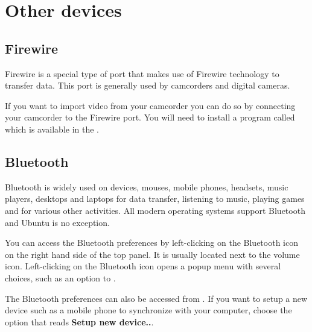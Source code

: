



\section{Other devices}
\label{sec:other-devices}
 
\subsection{Firewire}

Firewire is a special type of port that makes use of Firewire technology to 
transfer data. This port is generally used by camcorders and digital cameras. 

If you want to import video from your camcorder you can do so by connecting your camcorder to the Firewire port. 
You will need to install a program called  which is available in the . 

\subsection{Bluetooth}

Bluetooth is widely used on  devices, mouses, mobile phones, headsets, music players, 
desktops and laptops for data transfer, listening to music, playing games and for 
various other activities. All modern operating systems support Bluetooth and Ubuntu 
is no exception. 

You can access the Bluetooth preferences by left-clicking on the Bluetooth
 icon on the right hand side of the top panel. It is usually located next to the volume icon.
 Left-clicking on the Bluetooth icon opens a popup menu with several choices, such as an option to .


The Bluetooth preferences can also be accessed from . If you want to setup a new 
device such as a mobile phone to synchronize with your computer, choose the option 
that reads \textbf{Setup new device..}.

